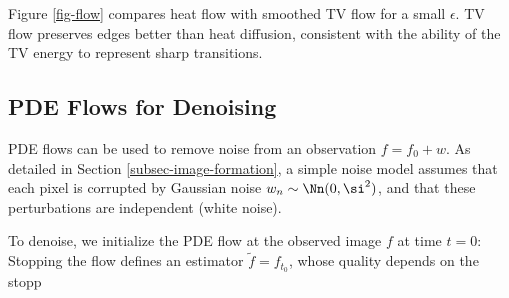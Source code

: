 Figure \ref{fig-flow} compares heat flow with smoothed TV flow for a small $\epsilon$. TV flow preserves edges better than heat diffusion, consistent with the ability of the TV energy to represent sharp transitions.

                                                                                          

                                
                                                                                                                                                                                                                                                                                                               
                            


                                                                      
\subsection{PDE Flows for Denoising}
\label{subsec-pde-denoise}

PDE flows can be used to remove noise from an observation $f= f_0 + w$. As detailed in Section \ref{subsec-image-formation}, a simple noise model assumes that each pixel is corrupted by Gaussian noise $w_n \sim \Nn(0,\si^2)$, and that these perturbations are independent (white noise).

To denoise, we initialize the PDE flow at the observed image $f$ at time $t=0$:
Stopping the flow defines an estimator $\tilde f = f_{t_0}$, whose quality depends on the stopp